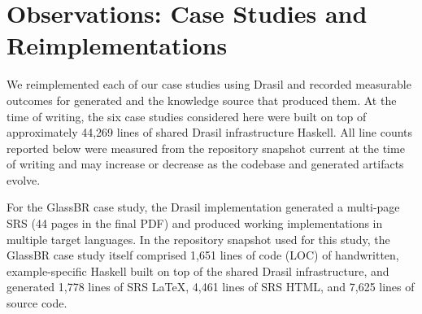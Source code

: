 \section{Observations: Case Studies and Reimplementations}
We reimplemented each of our case studies using Drasil and recorded
measurable outcomes for generated \sfs{} and the knowledge source that
produced them. At the time of writing, the six case studies considered here 
were built on top of approximately 44,269 lines of shared Drasil infrastructure 
Haskell. All line counts reported below were measured from the repository 
snapshot current at the time of writing and may increase or decrease as the 
codebase and generated artifacts evolve.

For the GlassBR case study, the Drasil implementation generated a multi-page
SRS (44 pages in the final PDF) and produced working implementations in multiple
target languages. In the repository snapshot used for this study, the GlassBR
case study itself comprised 1,651 lines of code (LOC) of handwritten,
example-specific Haskell built on top of the shared Drasil infrastructure, and
generated 1,778 lines of SRS \LaTeX{}, 4,461 lines of SRS HTML, and 7,625 lines
of source code.

